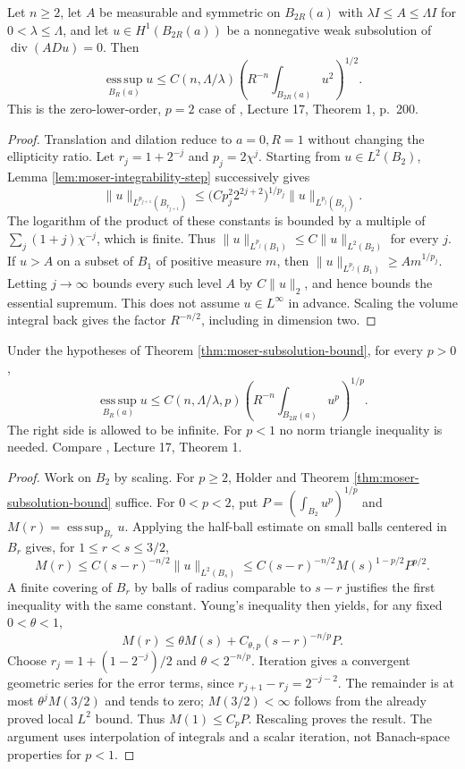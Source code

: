 \begin{theorem}\label{thm:moser-subsolution-bound}
Let $n\geq2$, let $A$ be measurable and symmetric on $B_{2R}(a)$ with $\lambda I\leq A\leq\Lambda I$ for $0<\lambda\leq\Lambda$, and let $u\in H^1(B_{2R}(a))$ be a nonnegative weak subsolution of $\operatorname{div}(A Du)=0$. Then
\[
 \operatorname*{ess\,sup}_{B_R(a)}u
 \leq C(n,\Lambda/\lambda)\left(R^{-n}\int_{B_{2R}(a)}u^2\right)^{1/2}.
\]
This is the zero-lower-order, $p=2$ case of \cite{SimonPDE}, Lecture 17, Theorem 1, p.~200.
\end{theorem}
\begin{proof}
Translation and dilation reduce to $a=0,R=1$ without changing the ellipticity ratio. Let $r_j=1+2^{-j}$ and $p_j=2\chi^j$. Starting from $u\in L^2(B_2)$, Lemma \ref{lem:moser-integrability-step} successively gives
\[
 \|u\|_{L^{p_{j+1}}(B_{r_{j+1}})}
 \leq\bigl(Cp_j^2 2^{2j+2}\bigr)^{1/p_j}
 \|u\|_{L^{p_j}(B_{r_j})}.
\]
The logarithm of the product of these constants is bounded by a multiple of $\sum_j(1+j)\chi^{-j}$, which is finite. Thus $\|u\|_{L^{p_j}(B_1)}\leq C\|u\|_{L^2(B_2)}$ for every $j$. If $u>A$ on a subset of $B_1$ of positive measure $m$, then $\|u\|_{L^{p_j}(B_1)}\geq A m^{1/p_j}$. Letting $j\to\infty$ bounds every such level $A$ by $C\|u\|_2$, and hence bounds the essential supremum. This does not assume $u\in L^\infty$ in advance. Scaling the volume integral back gives the factor $R^{-n/2}$, including in dimension two.
\end{proof}

\begin{proposition}\label{prop:moser-all-positive-exponents}
Under the hypotheses of Theorem \ref{thm:moser-subsolution-bound}, for every $p>0$,
\[
 \operatorname*{ess\,sup}_{B_R(a)}u
 \leq C(n,\Lambda/\lambda,p)\left(R^{-n}\int_{B_{2R}(a)}u^p\right)^{1/p}.
\]
The right side is allowed to be infinite. For $p<1$ no norm triangle inequality is needed. Compare \cite{SimonPDE}, Lecture 17, Theorem 1.
\end{proposition}
\begin{proof}
Work on $B_2$ by scaling. For $p\geq2$, Holder and Theorem \ref{thm:moser-subsolution-bound} suffice. For $0<p<2$, put $P=(\int_{B_2}u^p)^{1/p}$ and $M(r)=\operatorname*{ess\,sup}_{B_r}u$. Applying the half-ball estimate on small balls centered in $B_r$ gives, for $1\leq r<s\leq3/2$,
\[
 M(r)\leq C(s-r)^{-n/2}\|u\|_{L^2(B_s)}
 \leq C(s-r)^{-n/2}M(s)^{1-p/2}P^{p/2}.
\]
A finite covering of $B_r$ by balls of radius comparable to $s-r$ justifies the first inequality with the same constant. Young's inequality then yields, for any fixed $0<\theta<1$,
\[
 M(r)\leq\theta M(s)+C_{\theta,p}(s-r)^{-n/p}P.
\]
Choose $r_j=1+(1-2^{-j})/2$ and $\theta<2^{-n/p}$. Iteration gives a convergent geometric series for the error terms, since $r_{j+1}-r_j=2^{-j-2}$. The remainder is at most $\theta^j M(3/2)$ and tends to zero; $M(3/2)<\infty$ follows from the already proved local $L^2$ bound. Thus $M(1)\leq C_pP$. Rescaling proves the result. The argument uses interpolation of integrals and a scalar iteration, not Banach-space properties for $p<1$.
\end{proof}

